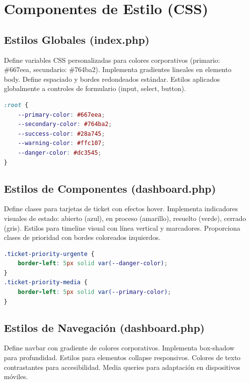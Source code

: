 \documentclass[12pt,a4paper]{article}
\begin{document}
\section{Componentes de Estilo (CSS)}

\subsection{Estilos Globales (index.php)}

Define variables CSS personalizadas para colores corporativos (primario: \#667eea, secundario: \#764ba2). Implementa gradientes lineales en elemento body. Define espaciado y bordes redondeados estándar. Estilos aplicados globalmente a controles de formulario (input, select, button).

\begin{lstlisting}[language=CSS,caption={Variables CSS}]
:root {
    --primary-color: #667eea;
    --secondary-color: #764ba2;
    --success-color: #28a745;
    --warning-color: #ffc107;
    --danger-color: #dc3545;
}
\end{lstlisting}

\subsection{Estilos de Componentes (dashboard.php)}

Define clases para tarjetas de ticket con efectos hover. Implementa indicadores visuales de estado: abierto (azul), en proceso (amarillo), resuelto (verde), cerrado (gris). Estilos para timeline visual con línea vertical y marcadores. Proporciona clases de prioridad con bordes coloreados izquierdos.

\begin{lstlisting}[language=CSS,caption={Estilos prioridad}]
.ticket-priority-urgente { 
    border-left: 5px solid var(--danger-color); 
}
.ticket-priority-media { 
    border-left: 5px solid var(--primary-color); 
}
\end{lstlisting}

\subsection{Estilos de Navegación (dashboard.php)}

Define navbar con gradiente de colores corporativos. Implementa box-shadow para profundidad. Estilos para elementos collapse responsivos. Colores de texto contrastantes para accesibilidad. Media queries para adaptación en dispositivos móviles.
\end{document}
